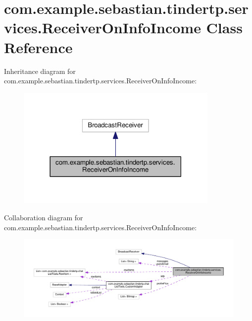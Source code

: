 \hypertarget{classcom_1_1example_1_1sebastian_1_1tindertp_1_1services_1_1ReceiverOnInfoIncome}{}\section{com.\+example.\+sebastian.\+tindertp.\+services.\+Receiver\+On\+Info\+Income Class Reference}
\label{classcom_1_1example_1_1sebastian_1_1tindertp_1_1services_1_1ReceiverOnInfoIncome}


Inheritance diagram for com.\+example.\+sebastian.\+tindertp.\+services.\+Receiver\+On\+Info\+Income\+:\nopagebreak
\begin{figure}[H]
\begin{center}
\leavevmode
\includegraphics[width=278pt]{classcom_1_1example_1_1sebastian_1_1tindertp_1_1services_1_1ReceiverOnInfoIncome__inherit__graph}
\end{center}
\end{figure}


Collaboration diagram for com.\+example.\+sebastian.\+tindertp.\+services.\+Receiver\+On\+Info\+Income\+:
\nopagebreak
\begin{figure}[H]
\begin{center}
\leavevmode
\includegraphics[width=350pt]{classcom_1_1example_1_1sebastian_1_1tindertp_1_1services_1_1ReceiverOnInfoIncome__coll__graph}
\end{center}
\end{figure}
